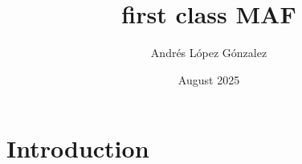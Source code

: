 \documentclass{article}
\title{first class MAF}
\author{Andrés López Gónzalez}
\date{August 2025}
\begin{document}
\maketitle

\section{Introduction}
\end{document}
